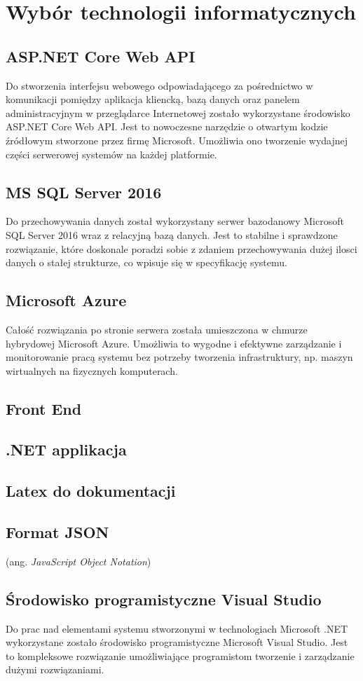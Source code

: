 \newpage\section{Wybór technologii informatycznych} \label{sec:technologie}
\subsection{ASP.NET Core Web API}
Do stworzenia interfejsu webowego odpowiadającego za pośrednictwo w komunikacji pomiędzy aplikacja kliencką, bazą danych oraz panelem administracyjnym w przeglądarce Internetowej zostało wykorzystane środowisko ASP.NET Core Web API. Jest to nowoczesne narzędzie o otwartym kodzie źródłowym stworzone przez firmę Microsoft. Umożliwia ono tworzenie wydajnej części serwerowej systemów na każdej platformie.

\subsection{MS SQL Server 2016}
Do przechowywania danych został wykorzystany serwer bazodanowy Microsoft SQL Server 2016 wraz z relacyjną bazą danych. Jest to stabilne i sprawdzone rozwiązanie, które doskonale poradzi sobie z zdaniem przechowywania dużej ilosci danych o stałej strukturze, co wpisuje się w specyfikację systemu.

\subsection{Microsoft Azure}
Całość rozwiązania po stronie serwera została umieszczona w chmurze hybrydowej Microsoft Azure. Umożliwia to wygodne i efektywne zarządzanie i monitorowanie pracą systemu bez potrzeby tworzenia infrastruktury, np. maszyn wirtualnych na fizycznych komputerach.

\subsection{Front End}
\subsection{.NET applikacja}
\subsection{Latex do dokumentacji}
\subsection{Format JSON}
(ang. \textit{JavaScript Object Notation}) \cite{json2017}
\subsection{Środowisko programistyczne Visual Studio}
Do prac nad elementami systemu stworzonymi w technologiach Microsoft .NET wykorzystane zostało środowisko programistyczne Microsoft Visual Studio. Jest to kompleksowe rozwiązanie umożliwiające programistom tworzenie i zarządzanie dużymi rozwiązaniami.